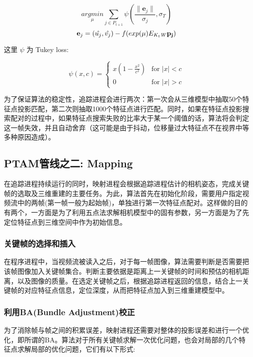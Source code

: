 \begin{equation}
\label{eq:post_update}
\underset{\mu}{argmin} \sum_{j\in P_{t+1}} \psi( \frac{\lVert\mathbf{e}_j\rVert}{\sigma_j} , \sigma_T)
\end{equation}
\begin{equation}
\mathbf{e}_j= (\hat{u_j},\hat{v_j})- f(exp(\mu)E_{K_{t}\mathit{W}} \mathbf{p_j})
\end{equation}

这里 $\psi$ 为 Tukey loss\cite{A86robuststatistics}:

\begin{equation}
\psi(x,c)= 
\begin{cases}
x(1-\frac{x^2}{c^2}) & \text{for }|x|<c \\
0  &  \text{for }|x|>c
\end{cases}
\end{equation}

为了保证算法的稳定性，追踪进程会进行两次：第一次会从三维模型中抽取50个特征点投影匹配，第二次则抽取1000个特征点进行匹配。同时，如果在特征点投影搜索配对的过程中，如果特征点搜索失败的比率大于某一个阈值的话，算法将会判定这一帧失效，并且自动舍弃（这可能是由于抖动，位移量过大特征点不在视界中等多种原因造成）。


\subsection{PTAM管线之二: Mapping}

在追踪进程持续运行的同时，映射进程会根据追踪进程估计的相机姿态，完成关键帧的选取及三维重建的主要任务。为此，算法首先在初始化阶段，需要用户指定视频流中的两帧(第一帧一般为起始帧)，单独进行第一次特征点配对。这样做的目的有两个，一方面是为了利用五点法求解相机模型中的固有参数，另一方面是为了先定位特征点到三维空间中作为初始信息。

\subsubsection{关键帧的选择和插入}
在程序进程中，当视频流被读入之后，对于每一帧图像，算法需要判断是否需要把该帧图像加入关键帧集合。判断主要依据是距离上一关键帧的时间和预估的相机距离，以及图像的质量。在选定关键帧之后，根据追踪进程返回的信息，结合上一关键帧的对应特征点信息，定位深度，从而把特征点加入到三维重建模型中。

\subsubsection{利用BA(Bundle Adjustment)校正}
为了消除帧与帧之间的积累误差，映射进程还需要对整体的投影误差和进行一个优化，即所谓的BA。算法对于所有关键帧求解一次优化问题，也会对局部的几个特征点求解局部的优化问题，它们有以下形式:

